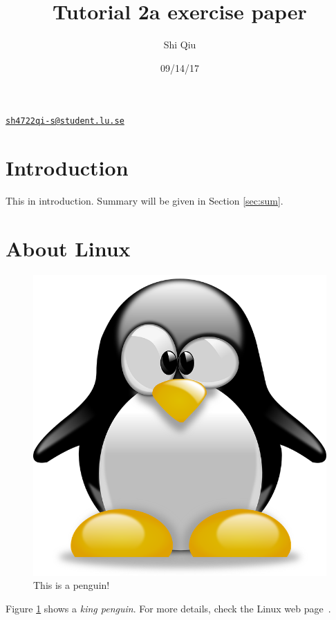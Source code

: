 \documentclass[a4paper,12pt,twoside]{article}
\author{Shi Qiu}
\title{Tutorial 2a exercise paper}
\date{09/14/17}
\begin{document}
\maketitle
\begin{center}
 \href{mailto:sh4722qi-s@student.lu.se}{\texttt{sh4722qi-s@student.lu.se}}
\end{center}
\tableofcontents
\newpage
\section{Introduction}\label{sec:intro}
This in introduction. Summary will be given in Section \ref{sec:sum}.

\section{About Linux}
\begin{figure}[ht]
 \begin{center}
  \includegraphics[scale=.15,trim=0cm 0cm 0 0]{penguin.png}
  \caption{This is a penguin!}
  \label{fig:penguin}
 \end{center}
\end{figure}


Figure \ref{fig:penguin} shows a \textit{king penguin}. For more details, check the Linux web page~\cite{linux}.
\end{document}
